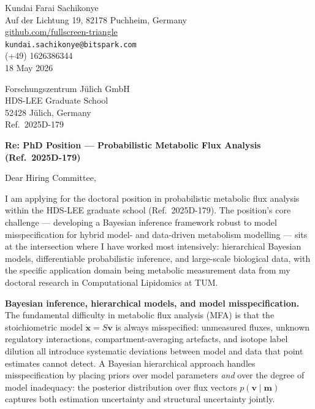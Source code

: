 \documentclass[12pt,a4paper]{article}
\begin{document}
\begin{flushright}
Kundai Farai Sachikonye \\
Auf der Lichtung 19, 82178 Puchheim, Germany \\
\href{https://github.com/fullscreen-triangle}{github.com/fullscreen-triangle} \\
\texttt{kundai.sachikonye@bitspark.com} \\
(+49) 1626386344 \\[6pt]
18 May 2026
\end{flushright}

\vspace{1em}

Forschungszentrum Jülich GmbH \\
HDS-LEE Graduate School \\
52428 Jülich, Germany \\
Ref.\ 2025D-179

\vspace{1.5em}

\textbf{Re: PhD Position --- Probabilistic Metabolic Flux Analysis (Ref.\ 2025D-179)}

\vspace{1em}

Dear Hiring Committee,

I am applying for the doctoral position in probabilistic metabolic flux analysis
within the HDS-LEE graduate school (Ref.\ 2025D-179).
The position's core challenge --- developing a Bayesian inference framework
robust to model misspecification for hybrid model- and data-driven metabolism
modelling --- sits at the intersection where I have worked most intensively:
hierarchical Bayesian models, differentiable probabilistic inference, and
large-scale biological data, with the specific application domain being
metabolic measurement data from my doctoral research in Computational
Lipidomics at TUM.

\textbf{Bayesian inference, hierarchical models, and model misspecification.}
The fundamental difficulty in metabolic flux analysis (MFA) is that the
stoichiometric model $\dot{\mathbf{x}} = S\mathbf{v}$ is always misspecified:
unmeasured fluxes, unknown regulatory interactions, compartment-averaging
artefacts, and isotope label dilution all introduce systematic deviations
between model and data that point estimates cannot detect.
A Bayesian hierarchical approach handles misspecification by placing priors
over model parameters \emph{and} over the degree of model inadequacy: the
posterior distribution over flux vectors $p(\mathbf{v} \mid \mathbf{m})$
captures both estimation uncertainty and structural uncertainty jointly.
\end{document}
